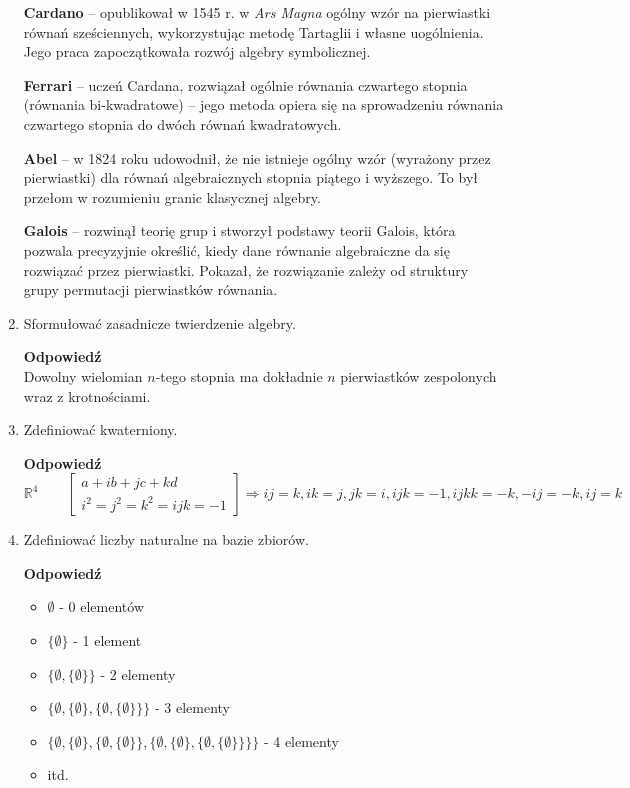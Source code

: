 \documentclass[12pt,a4paper]{article}
\newcounter{twierdzenie}
\theoremstyle{break}
\newcommand{\Odp}[1]{
		\begin{mdframed}[style=zadanie]
			\textbf{Odpowiedź}\\
			#1
		\end{mdframed}
	}
\begin{document}
\begin{enumerate}[1.]
{		\textbf{Cardano} – opublikował w 1545 r. w \emph{Ars Magna} ogólny wzór na pierwiastki równań sześciennych, wykorzystując metodę Tartaglii i własne uogólnienia. Jego praca zapoczątkowała rozwój algebry symbolicznej.
		
		\textbf{Ferrari} – uczeń Cardana, rozwiązał ogólnie równania czwartego stopnia (równania bi-kwadratowe) – jego metoda opiera się na sprowadzeniu równania czwartego stopnia do dwóch równań kwadratowych.
		
		\textbf{Abel} – w 1824 roku udowodnił, że nie istnieje ogólny wzór (wyrażony przez pierwiastki) dla równań algebraicznych stopnia piątego i wyższego. To był przełom w rozumieniu granic klasycznej algebry.
		
		\textbf{Galois} – rozwinął teorię grup i stworzył podstawy teorii Galois, która pozwala precyzyjnie określić, kiedy dane równanie algebraiczne da się rozwiązać przez pierwiastki. Pokazał, że rozwiązanie zależy od struktury grupy permutacji pierwiastków równania.
	}
	
	
	\item Sformułować zasadnicze twierdzenie algebry.
	\Odp{
		Dowolny wielomian $n$-tego stopnia ma dokładnie $n$ pierwiastków zespolonych wraz z krotnościami.
	}
	\newpage
	\item Zdefiniować kwaterniony.
	\Odp{
		$\mathbb{R}^4 \qquad \begin{bmatrix}
			a+ib+jc+kd\\
			i^2=j^2=k^2=ijk=-1
		\end{bmatrix} \Rightarrow ij=k, ik=j, jk=i, ijk=-1, ijkk=-k, -ij=-k, ij=k$
	}
	
	\item Zdefiniować liczby naturalne na bazie zbiorów.
	\Odp{
		\begin{itemize}
			\item $\emptyset$ - 0 elementów
			\item $\{\emptyset\}$ - 1 element
			\item $\{\emptyset,\{\emptyset\}\}$ - 2 elementy
			\item $\{\emptyset,\{\emptyset\},\{\emptyset,\{\emptyset\}\}\}$ - 3 elementy
			\item $\{\emptyset,\{\emptyset\},\{\emptyset,\{\emptyset\}\},\{\emptyset,\{\emptyset\},\{\emptyset,\{\emptyset\}\}\}\}$ - 4 elementy
			\item itd.
		\end{itemize}
	}
	

\end{enumerate}
\end{document}
